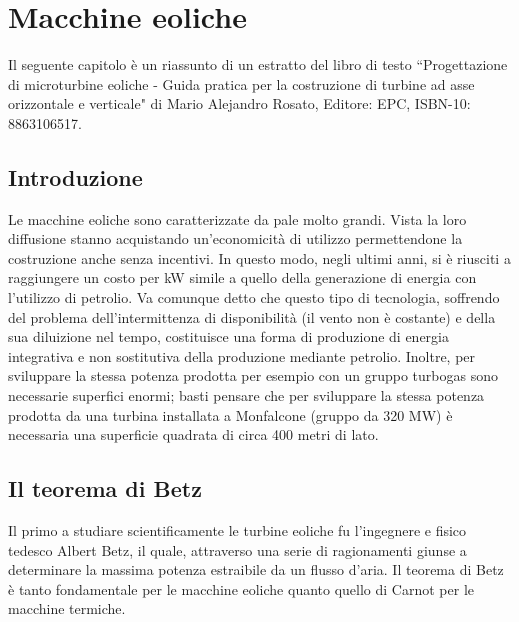 \chapter{Macchine eoliche}
Il seguente capitolo è un riassunto di un estratto del libro di testo ``Progettazione di microturbine eoliche - Guida pratica per la costruzione di turbine ad asse orizzontale e verticale" di Mario Alejandro Rosato, Editore: EPC, ISBN-10: 8863106517.
\section{Introduzione}
Le macchine eoliche sono caratterizzate da pale molto grandi. Vista la loro diffusione stanno acquistando un'economicità di utilizzo permettendone la costruzione anche senza incentivi. In questo modo, negli ultimi anni, si è riusciti a raggiungere un costo per kW simile a quello della generazione di energia con l'utilizzo di petrolio. Va comunque detto che questo tipo di tecnologia, soffrendo del problema dell'intermittenza di disponibilità (il vento non è costante) e della sua diluizione nel tempo, costituisce una forma di produzione di energia integrativa e non sostitutiva della produzione mediante petrolio. Inoltre, per sviluppare la stessa potenza prodotta per esempio con un gruppo turbogas sono necessarie superfici enormi; basti pensare che per sviluppare la stessa potenza prodotta da una turbina installata a Monfalcone (gruppo da 320 MW) è necessaria una superficie quadrata di circa 400 metri di lato.
\section{Il teorema di Betz}
Il primo a studiare scientificamente le turbine eoliche fu l'ingegnere e fisico tedesco Albert Betz, il quale, attraverso una serie di ragionamenti giunse a determinare la massima potenza estraibile da un flusso d'aria. Il teorema di Betz è tanto fondamentale per le macchine eoliche quanto quello di Carnot per le macchine termiche. 

